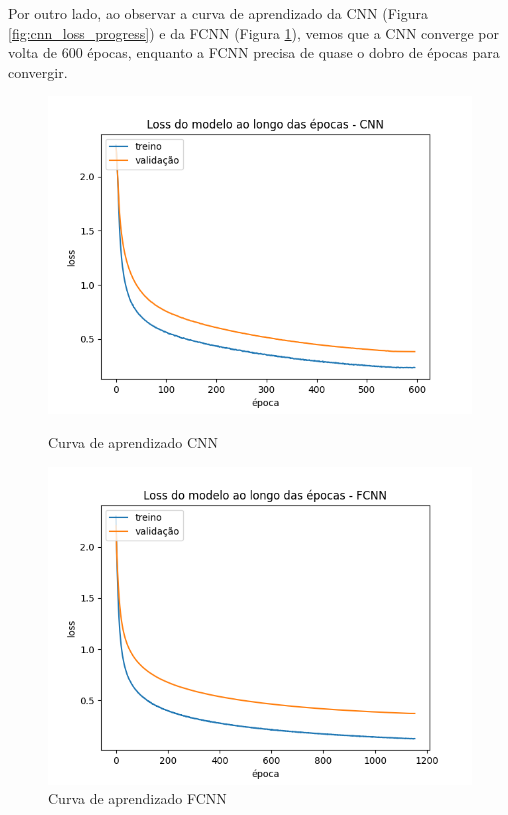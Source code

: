 \documentclass[12pt]{article}
\begin{document}
Por outro lado, ao observar a curva de aprendizado da CNN (Figura \ref{fig:cnn_loss_progress}) e da FCNN (Figura \ref{fig:fcnn_loss_progress}), vemos que a CNN converge por volta de 600 épocas, enquanto a FCNN precisa de quase o dobro de épocas para convergir.

\begin{figure}[H]
\centering
\begin{minipage}{0.5\textwidth}
  \centering
  \includegraphics[width=\textwidth]{../images/results_plt/cnn_loss_progress.png}
  \caption{Curva de aprendizado CNN}
  \label{fig:cnn_loss_progress}
\end{minipage}%
\hfill
\begin{minipage}{0.5\textwidth}
  \centering
  \includegraphics[width=\textwidth]{../images/results_plt/fcnn_loss_progress.png}
  \caption{Curva de aprendizado FCNN}
\label{fig:fcnn_loss_progress}
\end{minipage}
\end{figure}
\end{document}

